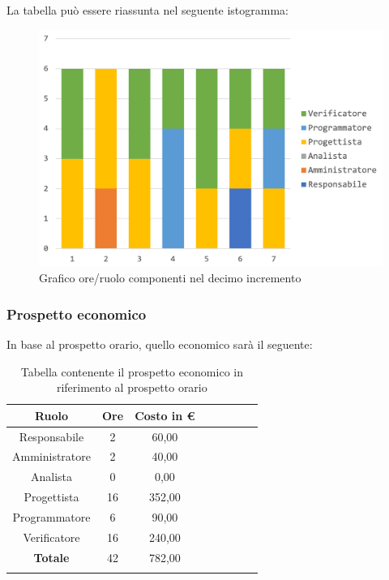 		La tabella può essere riassunta nel seguente istogramma:
		\begin{figure}[H]
			\centering
			\includegraphics[width=0.8\linewidth]{./images/preventivo/incremento10-1.png}
			\caption{Grafico ore/ruolo componenti nel decimo incremento}
			\label{fig:grafico suddivione ruoli incremento X}
		\end{figure}
		
		\subsubsection{Prospetto economico}
		In base al prospetto orario, quello economico sarà il seguente: 
		
		\begin{longtable}{|c|c|c|c|c|c|c|c|}
			\hline
			\rowcolor{lighter-grayer}
			\textbf{Ruolo} & \textbf{Ore} & \textbf{Costo in € } \\
			\hline
			\endfirsthead
			
			\hline
			Responsabile 	    & 2 & 60,00\\
			\hline 
			\hline
			Amministratore	   & 2 & 40,00\\
			\hline
			\hline
			Analista 				& 0 & 0,00\\
			\hline
			\hline
			Progettista 		   & 16 & 352,00\\
			\hline
			\hline
			Programmatore 	  & 6 & 90,00\\
			\hline
			\hline
			Verificatore 		   & 16 & 240,00\\
			\hline
			\textbf{Totale} 	 & 42 & 782,00\\
			\hline
			\caption{Tabella contenente il prospetto economico in riferimento al prospetto orario}
		\end{longtable}
		\pagebreak
		
